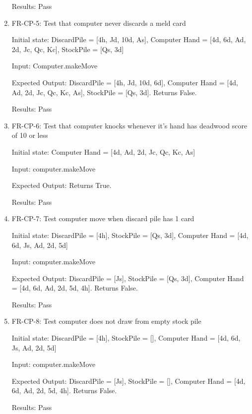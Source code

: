 \documentclass[12pt, titlepage]{article}
\begin{document}
\begin{enumerate}
    Results: Pass
    					
    \item FR-CP-5: Test that computer never discards a meld card
    
    Initial state: DiscardPile = [4h, Jd, 10d, As], Computer Hand = [4d, 6d, Ad, 2d, Jc, Qc, Kc], StockPile = [Qs, 3d]

    Input: Computer.makeMove
    
    Expected Output: DiscardPile = [4h, Jd, 10d, 6d], Computer Hand = [4d, Ad, 2d, Jc, Qc, Kc, As], StockPile = [Qs, 3d]. Returns False.
    
    Results: Pass

    \item FR-CP-6: Test that computer knocks whenever it's hand has deadwood score of 10 or less
    
    Initial state: Computer Hand = [4d, Ad, 2d, Jc, Qc, Kc, As]
    
    Input: computer.makeMove
    
    Expected Output: Returns True.
    
    Results: Pass
    
    \item FR-CP-7: Test computer move when discard pile has 1 card
    
    Initial state: DiscardPile = [4h], StockPile = [Qs, 3d], Computer Hand = [4d, 6d, Js, Ad, 2d, 5d]
    
    Input: computer.makeMove
    
    Expected Output: DiscardPile = [Js], StockPile = [Qs, 3d], Computer Hand = [4d, 6d, Ad, 2d, 5d, 4h]. Returns False.
    
    Results: Pass
    
    \item FR-CP-8: Test computer does not draw from empty stock pile
    
    Initial state: DiscardPile = [4h], StockPile = [], Computer Hand = [4d, 6d, Js, Ad, 2d, 5d]
    
    Input: computer.makeMove
    
    Expected Output: DiscardPile = [Js], StockPile = [], Computer Hand = [4d, 6d, Ad, 2d, 5d, 4h]. Returns False.
    
    Results: Pass

\end{enumerate}
\end{document}
